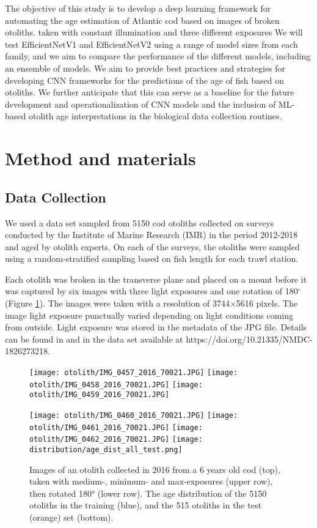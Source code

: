 \documentclass[10pt,letterpaper]{article}
\begin{document}
The objective of this study is to develop a deep learning framework for automating the age estimation of Atlantic cod based on  images of broken otoliths. taken with constant illumination and three different exposures We will test EfficientNetV1 and EfficientNetV2 using a range of model sizes from each family, and we aim to compare the performance of the different models, including an ensemble of models. We aim to provide best practices and strategies for developing CNN frameworks for the predictions of the age of fish based on otoliths. We further anticipate that this can serve as a baseline for the future development and operationalization of CNN models and the inclusion of ML-based otolith age interpretations in the biological data collection routines.

\section{Method and materials}

\subsection{Data Collection}

We used a data set sampled from 5150 cod otoliths collected 
on surveys conducted by the Institute of Marine Research (IMR) in the period 2012-2018 and aged by otolith experts. On each of the surveys, the otoliths were sampled using a random-stratified sampling based on fish length for each trawl station.

Each otolith was broken in the transverse plane and placed on a mount before it was captured by six images with three light exposures and one rotation of 180$^{\circ}$ (Figure \ref{marker1}). 
The images were taken with a resolution of 3744$\times$5616 pixels.  The image light exposure punctually varied depending on light conditions coming from outside. Light exposure was stored in the metadata of the JPG file. Details can be found in \citep{codOtolithsMyers} and in the data set  available at https://doi.org/10.21335/NMDC-1826273218.


\begin{figure}[ht!]
  \centering
  \texttt{[image: otolith/IMG\_0457\_2016\_70021.JPG]}
  \texttt{[image: otolith/IMG\_0458\_2016\_70021.JPG]}
  \texttt{[image: otolith/IMG\_0459\_2016\_70021.JPG]} 

  \texttt{[image: otolith/IMG\_0460\_2016\_70021.JPG]}
  \texttt{[image: otolith/IMG\_0461\_2016\_70021.JPG]}
  \texttt{[image: otolith/IMG\_0462\_2016\_70021.JPG]}
  \texttt{[image: distribution/age\_dist\_all\_test.png]}
    \caption{Images of an otolith collected in 2016 from a 6 years old cod (top), taken with medium-, minimum- and max-exposures (upper row), then rotated 180° (lower row). The age distribution of the 5150 otoliths in the training (blue), and the 515 otoliths in the test (orange) set (bottom).}
  \label{marker1}
\end{figure}
\end{document}
